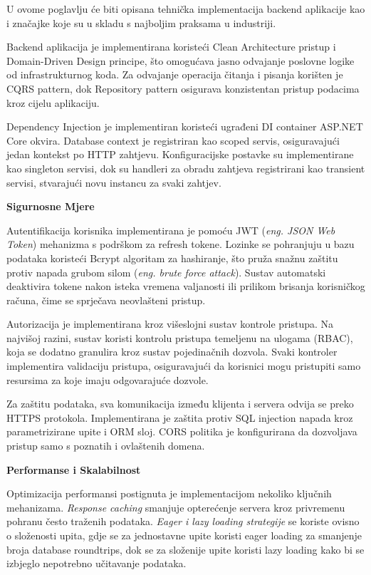 \documentclass[a4paper,12pt]{article}
\begin{document}
U ovome poglavlju će biti opisana tehnička implementacija backend aplikacije kao i značajke koje su u skladu s najboljim praksama u industriji.

Backend aplikacija je implementirana koristeći Clean Architecture pristup i Domain-Driven Design principe, što omogućava jasno odvajanje poslovne logike od infrastrukturnog koda. Za odvajanje operacija čitanja i pisanja korišten je CQRS pattern, dok Repository pattern osigurava konzistentan pristup podacima kroz cijelu aplikaciju.

Dependency Injection je implementiran koristeći ugrađeni DI container ASP.NET Core okvira. Database context je registriran kao scoped servis, osiguravajući jedan kontekst po HTTP zahtjevu. Konfiguracijske postavke su implementirane kao singleton servisi, dok su handleri za obradu zahtjeva registrirani kao transient servisi, stvarajući novu instancu za svaki zahtjev.

\noindent\textbf{Sigurnosne Mjere}

Autentifikacija korisnika implementirana je pomoću JWT (\emph{eng. JSON Web Token}) mehanizma s podrškom za refresh tokene. Lozinke se pohranjuju u bazu podataka koristeći Bcrypt algoritam za hashiranje, što pruža snažnu zaštitu protiv napada grubom silom (\emph{eng. brute force attack}). Sustav automatski deaktivira tokene nakon isteka vremena valjanosti ili prilikom brisanja korisničkog računa, čime se sprječava neovlašteni pristup.

Autorizacija je implementirana kroz višeslojni sustav kontrole pristupa. Na najvišoj razini, sustav koristi kontrolu pristupa temeljenu na ulogama (RBAC), koja se dodatno granulira kroz sustav pojedinačnih dozvola. Svaki kontroler implementira validaciju pristupa, osiguravajući da korisnici mogu pristupiti samo resursima za koje imaju odgovarajuće dozvole.

Za zaštitu podataka, sva komunikacija između klijenta i servera odvija se preko HTTPS protokola. Implementirana je zaštita protiv SQL injection napada kroz parametrizirane upite i ORM sloj. CORS politika je konfigurirana da dozvoljava pristup samo s poznatih i ovlaštenih domena.

\noindent\textbf{Performanse i Skalabilnost}

Optimizacija performansi postignuta je implementacijom nekoliko ključnih mehanizama. \emph{Response caching} smanjuje opterećenje servera kroz privremenu pohranu često traženih podataka. \emph{Eager i lazy loading strategije} se koriste ovisno o složenosti upita, gdje se za jednostavne upite koristi eager loading za smanjenje broja database roundtrips, dok se za složenije upite koristi lazy loading kako bi se izbjeglo nepotrebno učitavanje podataka.
\end{document}
